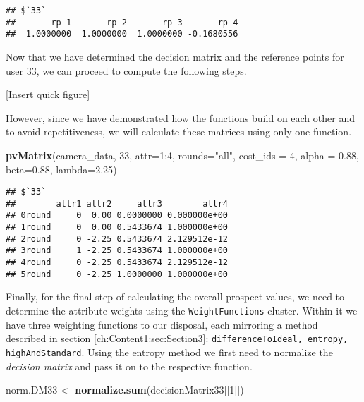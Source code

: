 \documentclass[]{article}
\newenvironment{Shaded}{\begin{snugshade}}{\end{snugshade}}
\newcommand{\KeywordTok}[1]{\textcolor[rgb]{0.13,0.29,0.53}{\textbf{{#1}}}}
\newcommand{\DataTypeTok}[1]{\textcolor[rgb]{0.13,0.29,0.53}{{#1}}}
\newcommand{\DecValTok}[1]{\textcolor[rgb]{0.00,0.00,0.81}{{#1}}}
\newcommand{\FloatTok}[1]{\textcolor[rgb]{0.00,0.00,0.81}{{#1}}}
\newcommand{\StringTok}[1]{\textcolor[rgb]{0.31,0.60,0.02}{{#1}}}
\newcommand{\NormalTok}[1]{{#1}}
\begin{document}
\begin{verbatim}
## $`33`
##       rp 1       rp 2       rp 3       rp 4 
##  1.0000000  1.0000000  1.0000000 -0.1680556
\end{verbatim}

Now that we have determined the decision matrix and the reference points
for user 33, we can proceed to compute the following steps.

{[}Insert quick figure{]}

However, since we have demonstrated how the functions build on each
other and to avoid repetitiveness, we will calculate these matrices
using only one function.

\begin{Shaded}
\begin{Highlighting}[]
\KeywordTok{pvMatrix}\NormalTok{(camera_data, }\DecValTok{33}\NormalTok{, }\DataTypeTok{attr=}\DecValTok{1}\NormalTok{:}\DecValTok{4}\NormalTok{, }\DataTypeTok{rounds=}\StringTok{"all"}\NormalTok{, }\DataTypeTok{cost_ids =} \DecValTok{4}\NormalTok{,}
         \DataTypeTok{alpha =} \FloatTok{0.88}\NormalTok{, }\DataTypeTok{beta=}\FloatTok{0.88}\NormalTok{, }\DataTypeTok{lambda=}\FloatTok{2.25}\NormalTok{)}
\end{Highlighting}
\end{Shaded}

\begin{verbatim}
## $`33`
##        attr1 attr2     attr3        attr4
## 0round     0  0.00 0.0000000 0.000000e+00
## 1round     0  0.00 0.5433674 1.000000e+00
## 2round     0 -2.25 0.5433674 2.129512e-12
## 3round     1 -2.25 0.5433674 1.000000e+00
## 4round     0 -2.25 0.5433674 2.129512e-12
## 5round     0 -2.25 1.0000000 1.000000e+00
\end{verbatim}

Finally, for the final step of calculating the overall prospect values,
we need to determine the attribute weights using the
\texttt{WeightFunctions} cluster. Within it we have three weighting
functions to our disposal, each mirroring a method described in section
\ref{ch:Content1:sec:Section3}:
\texttt{differenceToIdeal, entropy, highAndStandard}. Using the entropy
method we first need to normalize the \emph{decision matrix} and pass it
on to the respective function.

\begin{Shaded}
\begin{Highlighting}[]
\NormalTok{norm.DM33 <-}\StringTok{ }\KeywordTok{normalize.sum}\NormalTok{(decisionMatrix33[[}\DecValTok{1}\NormalTok{]])}
\end{Highlighting}
\end{Shaded}
\end{document}
